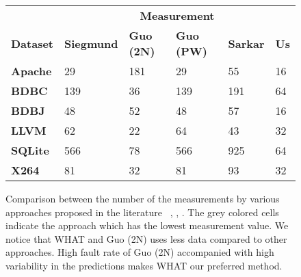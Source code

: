 \begin{figure}[!t]
\centering
\begin{tabular}{|l|l|l|l|l|l|}
\hline
                                   & \multicolumn{5}{c|}{\textbf{Measurement}}                                                                         \\ \cline{2-6} 
\multirow{-2}{*}{\textbf{Dataset}} & \textbf{Siegmund} & \textbf{Guo (2N)}          & \textbf{Guo (PW)} & \textbf{Sarkar} & \textbf{Us}                \\ \hline
\textbf{Apache}                    & 29                & 181                        & 29                & 55              & \cellcolor[HTML]{C0C0C0}16 \\ \hline
\textbf{BDBC}                      & 139               & \cellcolor[HTML]{C0C0C0}36 & 139               & 191             & 64                         \\ \hline
\textbf{BDBJ}                      & 48                & 52                         & 48                & 57              & \cellcolor[HTML]{C0C0C0}16 \\ \hline
\textbf{LLVM}                      & 62                & \cellcolor[HTML]{C0C0C0}22 & 64                & 43              & 32                         \\ \hline
\textbf{SQLite}                    & 566               & 78                         & 566               & 925             & \cellcolor[HTML]{C0C0C0}64 \\ \hline
\textbf{X264}                      & 81                & \cellcolor[HTML]{C0C0C0}32 & 81                & 93              & \cellcolor[HTML]{C0C0C0}32 \\ \hline
\end{tabular}
\caption{Comparison between the number of the measurements by various approaches proposed in the literature ~\cite{siegmund2012predicting}, \cite{guo2013variability}, \cite{sarkar2015cost}. The grey colored cells indicate the approach which has the lowest measurement value.  We notice that WHAT and Guo (2N) uses less data compared to other approaches. High fault rate  of Guo (2N) accompanied with high variability in the predictions makes WHAT our preferred method.}\label{fig:measurements}
\end{figure}